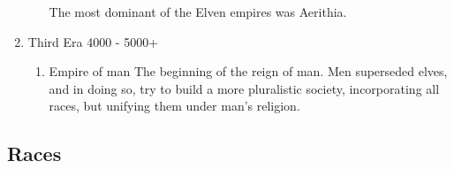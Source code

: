 \documentclass[11pt]{article}
\begin{document}
\begin{enumerate}
\begin{enumerate}
The most dominant of the Elven empires was Aerithia.
\end{enumerate}
\item Third Era 4000 - 5000+
\label{sec:orga397fe0}
\begin{enumerate}
\item Empire of man
\label{sec:org3dd6aac}
The beginning of the reign of man. Men superseded elves, and in doing so, try to build a more pluralistic society, incorporating all races, but unifying them under man's religion.
\end{enumerate}
\end{enumerate}

\subsection{Races}
\label{sec:org44c5776}
\end{document}
